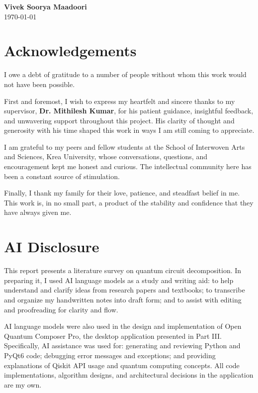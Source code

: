 \documentclass[12pt, a4paper, oneside]{report}
\theoremstyle{plain}
\theoremstyle{definition}
\theoremstyle{remark}
\begin{document}
\vspace{3cm}

\noindent
\textbf{Vivek Soorya Maadoori}\\[0.3em]
\today

\clearpage
\thispagestyle{plain}
\chapter*{Acknowledgements}

I owe a debt of gratitude to a number of people without whom this work would not have been possible.

First and foremost, I wish to express my heartfelt and sincere thanks to my supervisor, \textbf{Dr. Mithilesh Kumar}, for his patient guidance, insightful feedback, and unwavering support throughout this project. His clarity of thought and generosity with his time shaped this work in ways I am still coming to appreciate.

I am grateful to my peers and fellow students at the School of Interwoven Arts and Sciences, Krea University, whose conversations, questions, and encouragement kept me honest and curious. The intellectual community here has been a constant source of stimulation.

Finally, I thank my family for their love, patience, and steadfast belief in me. This work is, in no small part, a product of the stability and confidence that they have always given me.

\clearpage
\thispagestyle{plain}
\chapter*{AI Disclosure}

This report presents a literature survey on quantum circuit decomposition. In preparing it, I used
AI language models as a study and writing aid: to help understand and clarify ideas from
research papers and textbooks; to transcribe and organize my handwritten notes into draft
form; and to assist with editing and proofreading for clarity and flow.

AI language models were also used in the design and implementation of Open Quantum Composer Pro,
the desktop application presented in Part III. Specifically, AI assistance was used for:
generating and reviewing Python and PyQt6 code; debugging error messages and exceptions;
and providing explanations of Qiskit API usage and quantum computing concepts. All code
implementations, algorithm designs, and architectural decisions in the application are my own.
\end{document}
